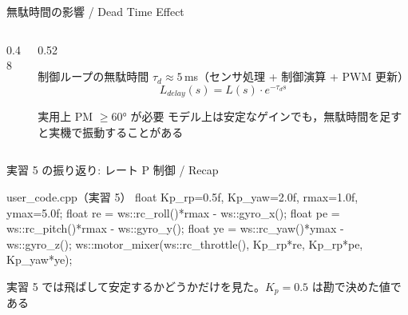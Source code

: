\begin{frame}{無駄時間の影響 / Dead Time Effect}
  \begin{columns}[c]
    \begin{column}{0.48\textwidth}
      \centering
      \resizebox{\columnwidth}{!}{}
    \end{column}
    \begin{column}{0.52\textwidth}
      \begin{block}{制御ループの無駄時間}\small
        \setlength{\abovedisplayskip}{2pt}\setlength{\belowdisplayskip}{2pt}%
        \setlength{\abovedisplayshortskip}{2pt}\setlength{\belowdisplayshortskip}{2pt}%
        $\tau_d \approx 5$\,ms（センサ処理 + 制御演算 + PWM 更新）
        \[
          L_{delay}(s) = L(s)\cdot e^{-\tau_d s}
        \]
      \end{block}

      \vspace{0.3em}

      \begin{alertblock}{\small 実用上 PM $\geq 60°$ が必要}\scriptsize
        モデル上は安定なゲインでも，無駄時間を足すと実機で振動することがある
      \end{alertblock}
    \end{column}
  \end{columns}
\end{frame}

\begin{frame}[fragile]{実習 5 の振り返り: レート P 制御 / Recap}
  \begin{sflisting}[basicstyle=\ttfamily\scriptsize]{user\_code.cpp（実習 5）}
float Kp_rp=0.5f, Kp_yaw=2.0f, rmax=1.0f, ymax=5.0f;
float re = ws::rc_roll()*rmax  - ws::gyro_x();
float pe = ws::rc_pitch()*rmax - ws::gyro_y();
float ye = ws::rc_yaw()*ymax   - ws::gyro_z();
ws::motor_mixer(ws::rc_throttle(),
    Kp_rp*re, Kp_rp*pe, Kp_yaw*ye);
  \end{sflisting}

  \vspace{0.5em}

  {\small 実習 5 では飛ばして安定するかどうかだけを見た。$K_p=0.5$ は勘で決めた値である}
\end{frame}

